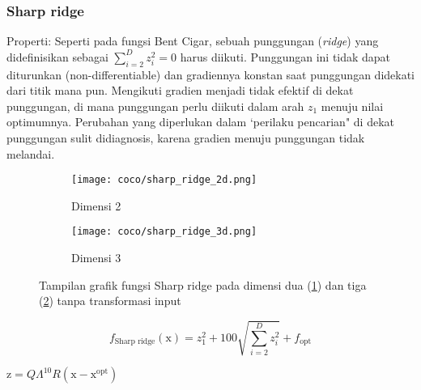 \subsubsection*{Sharp ridge}
\noindent Properti:
Seperti pada fungsi Bent Cigar, sebuah punggungan (\textit{ridge}) yang didefinisikan sebagai $\sum_{i=2}^{D}z_i^2= 0$ harus diikuti. Punggungan ini tidak dapat diturunkan (non-differentiable) dan gradiennya konstan saat punggungan didekati dari titik mana pun. Mengikuti gradien menjadi tidak efektif di dekat punggungan, di mana punggungan perlu diikuti dalam arah $z_1$ menuju nilai optimumnya. Perubahan yang diperlukan dalam `perilaku pencarian" di dekat punggungan sulit didiagnosis, karena gradien menuju punggungan tidak melandai.
\begin{figure}[H]
	\centering
	\begin{subfigure}[b]{0.4\textwidth}
		\centering
		\texttt{[image: coco/sharp\_ridge\_2d.png]}
		\caption{Dimensi 2}
		\label{fig:sharp_ridge_2d}
	\end{subfigure}
	\hfill
	\begin{subfigure}[b]{0.4\textwidth}
		\centering
		\texttt{[image: coco/sharp\_ridge\_3d.png]}
		\caption{Dimensi 3}
		\label{fig:sharp_ridge_3d}
	\end{subfigure}
	\caption{Tampilan grafik fungsi Sharp ridge pada dimensi dua (\cref{fig:sharp_ridge_2d}) dan tiga (\cref{fig:sharp_ridge_3d}) tanpa transformasi input}
	\label{fig:sharp_ridge}
\end{figure}
\begin{equation}
  f_{\text{Sharp ridge}}(\mathrm{x})=z_1^2+100\sqrt{\sum_{i=2}^{D}z_i^2}+f_{\text{opt}}
\end{equation}
\begin{packed_item}
    \item $\mathrm{z}=Q\Lambda^{10}R(\mathrm{x}-\mathrm{x}^{\text{opt}})$
\end{packed_item}

